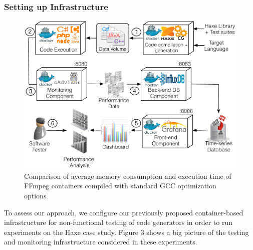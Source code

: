 \subsubsection{Setting up Infrastructure}
\begin{figure}[h]
	\centering
	\includegraphics[width=1\linewidth]{Ressources/settingup.pdf}
	\caption{Comparison of average memory consumption and execution time of FFmpeg containers compiled with standard GCC optimization options}
\end{figure}
To assess our approach, we configure our previously proposed container-based infrastructure for non-functional testing of code generators in order to run experiments on the Haxe case study.
Figure 3 shows a big picture of the testing and monitoring infrastructure considered in these experiments.
